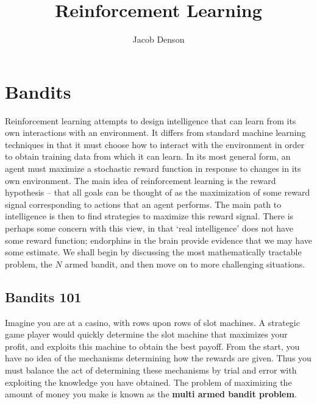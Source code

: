

\title{Reinforcement Learning}
\author{Jacob Denson}



\maketitle
\tableofcontents
{}

\newpage

\part{Bandits}

Reinforcement learning attempts to design intelligence that can learn from its own interactions with an environment. It differs from standard machine learning techniques in that it must choose how to interact with the environment in order to obtain training data from which it can learn. In its most general form, an agent must maximize a stochastic reward function in response to changes in its own environment. The main idea of reinforcement learning is the reward hypothesis -- that all goals can be thought of as the maximization of some reward signal corresponding to actions that an agent performs. The main path to intelligence is then to find strategies to maximize this reward signal. There is perhaps some concern with this view, in that `real intelligence' does not have some reward function; endorphins in the brain provide evidence that we may have some estimate. We shall begin by discussing the most mathematically tractable problem, the $N$ armed bandit, and then move on to more challenging situations.

\chapter{Bandits 101}

Imagine you are at a casino, with rows upon rows of slot machines. A strategic game player would quickly determine the slot machine that maximizes your profit, and exploits this machine to obtain the best payoff. From the start, you have no idea of the mechanisms determining how the rewards are given. Thus you must balance the act of determining these mechanisms by trial and error with exploiting the knowledge you have obtained. The problem of maximizing the amount of money you make is known as the {\bf multi armed bandit problem}.

